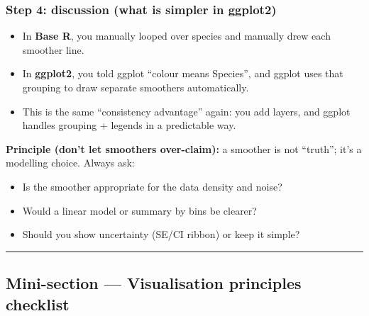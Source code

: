\documentclass[
  letterpaper,
  DIV=11,
  numbers=noendperiod]{scrartcl}
\providecommand{\tightlist}{%
  \setlength{\itemsep}{0pt}\setlength{\parskip}{0pt}}\usepackage{longtable,booktabs,array}
\begin{document}
\subsubsection{Step 4: discussion (what is simpler in
ggplot2)}\label{step-4-discussion-what-is-simpler-in-ggplot2}

\begin{itemize}
\tightlist
\item
  In \textbf{Base R}, you manually looped over species and manually drew
  each smoother line.
\item
  In \textbf{ggplot2}, you told ggplot ``colour means Species'', and
  ggplot uses that grouping to draw separate smoothers automatically.
\item
  This is the same ``consistency advantage'' again: you add layers, and
  ggplot handles grouping + legends in a predictable way.
\end{itemize}

\begin{tcolorbox}[enhanced jigsaw, opacitybacktitle=0.6, left=2mm, bottomrule=.15mm, coltitle=black, opacityback=0, toptitle=1mm, title=\textcolor{quarto-callout-warning-color}{\faExclamationTriangle}\hspace{0.5em}{Warning}, colbacktitle=quarto-callout-warning-color!10!white, breakable, colback=white, rightrule=.15mm, colframe=quarto-callout-warning-color-frame, bottomtitle=1mm, arc=.35mm, titlerule=0mm, toprule=.15mm, leftrule=.75mm]

\textbf{Principle (don't let smoothers over-claim):} a smoother is not
``truth''; it's a modelling choice. Always ask:

\begin{itemize}
\tightlist
\item
  Is the smoother appropriate for the data density and noise?
\item
  Would a linear model or summary by bins be clearer?
\item
  Should you show uncertainty (SE/CI ribbon) or keep it simple?
\end{itemize}

\end{tcolorbox}

\begin{center}\rule{0.5\linewidth}{0.5pt}\end{center}

\subsection{Mini-section --- Visualisation principles
checklist}\label{mini-section-visualisation-principles-checklist}
\end{document}
